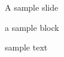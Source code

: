 \documentclass{beamer}
\begin{document}
\begin{frame}{A sample slide}

	\begin{block}{a sample block}

		sample text

	\end{block}


\end{frame}
\end{document}

